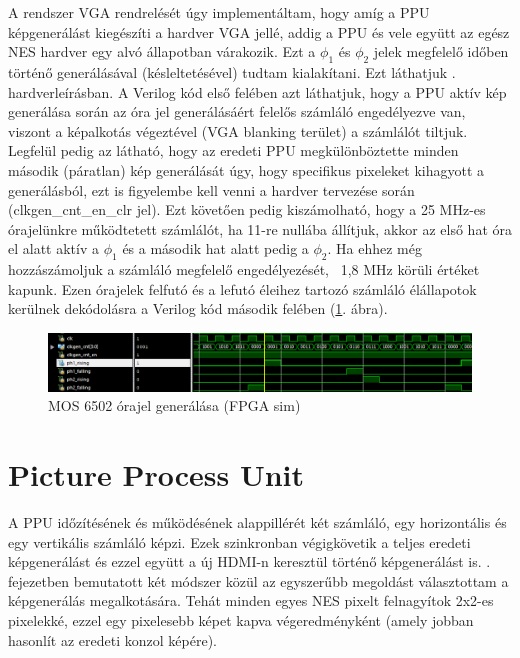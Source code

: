 A rendszer %
VGA rendrelését úgy implementáltam, hogy amíg a PPU képgenerálást kiegészíti a hardver VGA jellé, addig a PPU és vele együtt az egész NES hardver egy alvó állapotban várakozik. Ezt a $\phi_1$ és $\phi_2$ jelek megfelelő időben történő generálásával (késleltetésével) tudtam kialakítani. Ezt láthatjuk . hardverleírásban. A Verilog kód első felében azt láthatjuk, hogy a PPU aktív kép generálása során az óra jel generálásáért felelős számláló engedélyezve van, viszont a képalkotás végeztével (VGA blanking terület) a számlálót tiltjuk. Legfelül pedig az látható, hogy az eredeti PPU megkülönböztette minden második (páratlan) kép generálását úgy, hogy specifikus pixeleket kihagyott a generálásból, ezt is figyelembe kell venni a hardver tervezése során (clkgen\_cnt\_en\_clr jel). Ezt követően pedig kiszámolható, hogy a 25 MHz-es órajelünkre működtetett számlálót, ha 11-re nullába állítjuk, akkor az első hat óra el alatt aktív a $\phi_1$ és a második hat alatt pedig a $\phi_2$. Ha ehhez még hozzászámoljuk a számláló megfelelő engedélyezését, ~1,8 MHz körüli értéket kapunk. Ezen órajelek felfutó és a lefutó éleihez tartozó számláló élállapotok kerülnek dekódolásra a Verilog kód második felében (\ref{fig:FPGA-phi1-phi2}. ábra).

\begin{figure}[H]
	\centering
	\includegraphics[width=150mm, keepaspectratio]{figures/fpga-ph1-ph2}
	\caption{MOS 6502 órajel generálása (FPGA sim)} 
	\label{fig:FPGA-phi1-phi2}
\end{figure} 

\section{Picture Process Unit}
\label{sec:PPU-FPGA}

A PPU időzítésének és működésének alappillérét két számláló, egy horizontális és egy vertikális számláló képzi. Ezek szinkronban végigkövetik a teljes eredeti képgenerálást és ezzel együtt a új HDMI-n keresztül történő képgenerálást is. . fejezetben bemutatott két módszer közül az egyszerűbb megoldást választottam a képgenerálás megalkotására. Tehát minden egyes NES pixelt felnagyítok 2x2-es pixelekké, ezzel egy pixelesebb %
képet kapva végeredményként (amely jobban hasonlít az eredeti konzol képére).

